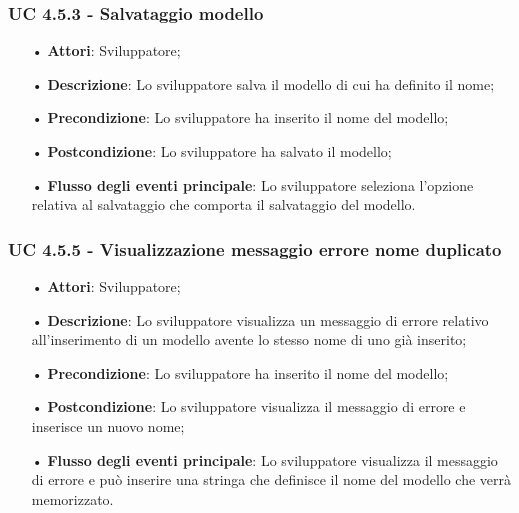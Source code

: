 \subsubsection{UC 4.5.3 - Salvataggio modello}
\begin{itemize}
\item[•]\textbf{Attori}: Sviluppatore;
\item[•]\textbf{Descrizione}: Lo sviluppatore salva il modello di cui ha definito il nome;
\item[•]\textbf{Precondizione}: Lo sviluppatore ha inserito il nome del modello;
\item[•]\textbf{Postcondizione}: Lo sviluppatore ha salvato il modello;
\item[•]\textbf{Flusso degli eventi principale}:  Lo sviluppatore seleziona l'opzione relativa al salvataggio che comporta il salvataggio del modello.
\end{itemize}

\subsubsection{UC 4.5.5 - Visualizzazione messaggio errore nome duplicato}
\begin{itemize}
\item[•]\textbf{Attori}: Sviluppatore;
\item[•]\textbf{Descrizione}: Lo sviluppatore visualizza un messaggio di errore relativo all'inserimento di un modello avente lo stesso nome di uno già inserito;
\item[•]\textbf{Precondizione}: Lo sviluppatore ha inserito il nome del modello;
\item[•]\textbf{Postcondizione}: Lo sviluppatore visualizza il messaggio di errore e inserisce un nuovo nome;
\item[•]\textbf{Flusso degli eventi principale}:  Lo sviluppatore visualizza il messaggio di errore e può inserire una stringa che definisce il nome del modello che verrà memorizzato.
\end{itemize}

